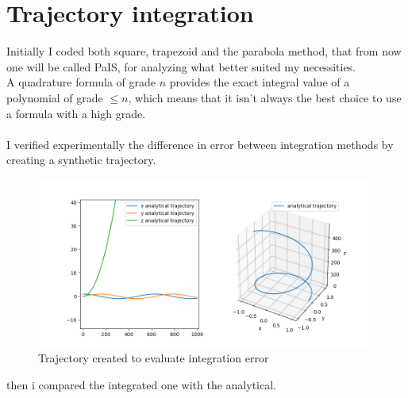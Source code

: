 \chapter{Trajectory integration}
\label{chap:trajectory_integration}

Initially I coded both square, trapezoid and the parabola method, that from now one will be called PaIS, for analyzing what better suited my necessities. \cite{casciola} \\
A quadrature formula of grade $n$ provides the exact integral value of a polynomial of grade $\leq n$, which means that it isn't always the best choice to use a formula with a high grade. \\
\\
\justify
I verified experimentally the difference in error between integration methods by creating a synthetic trajectory.
\begin{figure}[H]
\centering
\includegraphics[scale=0.6]{spring.png}
\caption{Trajectory created to evaluate integration error}
\end{figure}
\justify
then i compared the integrated one with the analytical.
